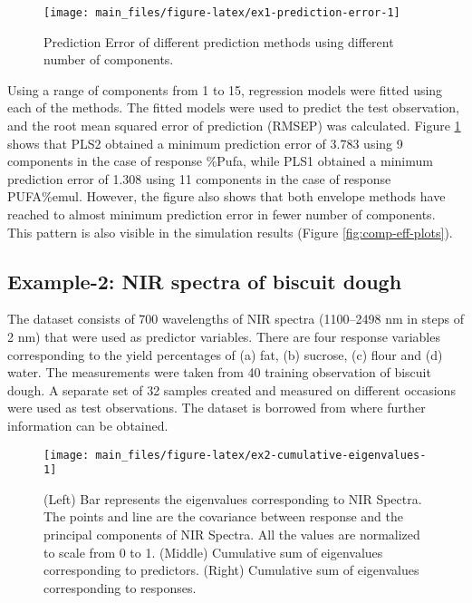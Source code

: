 \documentclass[review]{elsarticle}
\begin{document}
\begin{figure}[!htb]
\texttt{[image: main\_files/figure-latex/ex1-prediction-error-1]} \caption{Prediction Error of different prediction methods using different number of components.}\label{fig:ex1-prediction-error}
\end{figure}

Using a range of components from 1 to 15, regression models were fitted
using each of the methods. The fitted models were used to predict the
test observation, and the root mean squared error of prediction (RMSEP)
was calculated. Figure \ref{fig:ex1-prediction-error} shows that PLS2
obtained a minimum prediction error of 3.783 using 9 components in the
case of response \%Pufa, while PLS1 obtained a minimum prediction error
of 1.308 using 11 components in the case of response PUFA\%emul.
However, the figure also shows that both envelope methods have reached
to almost minimum prediction error in fewer number of components. This
pattern is also visible in the simulation results (Figure
\ref{fig:comp-eff-plots}).

\subsection{Example-2: NIR spectra of biscuit
dough}\label{example-2-nir-spectra-of-biscuit-dough}

The dataset consists of 700 wavelengths of NIR spectra (1100--2498 nm in
steps of 2 nm) that were used as predictor variables. There are four
response variables corresponding to the yield percentages of (a) fat,
(b) sucrose, (c) flour and (d) water. The measurements were taken from
40 training observation of biscuit dough. A separate set of 32 samples
created and measured on different occasions were used as test
observations. The dataset is borrowed from \citet{indahl2005twist} where
further information can be obtained.








\begin{figure}
\texttt{[image: main\_files/figure-latex/ex2-cumulative-eigenvalues-1]} \caption{(Left) Bar represents the eigenvalues
corresponding to NIR Spectra. The points and line are the covariance
between response and the principal components of NIR Spectra. All the
values are normalized to scale from 0 to 1. (Middle) Cumulative sum of
eigenvalues corresponding to predictors. (Right) Cumulative sum of
eigenvalues corresponding to responses.}\label{fig:ex2-cumulative-eigenvalues}
\end{figure}
\end{document}
